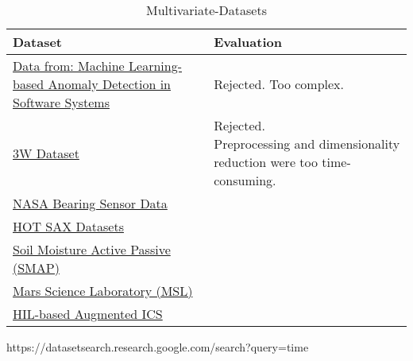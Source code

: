 \begin{table}[h]\centering
        \begin{tabular}{ll}
            Dataset                                                                                                                             & Evaluation    \\\midrule
            \href{https://www.kaggle.com/anomalydetectionml/features}{Data from: Machine Learning-based Anomaly Detection in Software Systems}  & Rejected. Too complex.              \\\addlinespace
            \href{https://github.com/ricardovvargas/3w_dataset}{3W Dataset}                                                                     & \makecell[l]{Rejected.\\Preprocessing and dimensionality reduction were too time-consuming.}              \\\addlinespace
            \href{https://www.kaggle.com/rkuo2000/nasa-bearing-sensor-data/notebooks}{NASA Bearing Sensor Data}                                 &               \\\addlinespace
            \href{https://github.com/chickenbestlover/RNN-Time-series-Anomaly-Detection}{HOT SAX Datasets}                                      &               \\\addlinespace
            \href{https://github.com/khundman/telemanom}{Soil Moisture Active Passive (SMAP)}                                                   &               \\\addlinespace
            \href{https://github.com/khundman/telemanom}{Mars Science Laboratory  (MSL)}                                                        &               \\\addlinespace
            \href{https://www.kaggle.com/icsdataset/hai-security-dataset}{HIL-based Augmented ICS}                                              &               \\
        \end{tabular}
        \caption{Multivariate-Datasets}\label{tab:multivariate-datasets}
\end{table}
https://datasetsearch.research.google.com/search?query=time%

